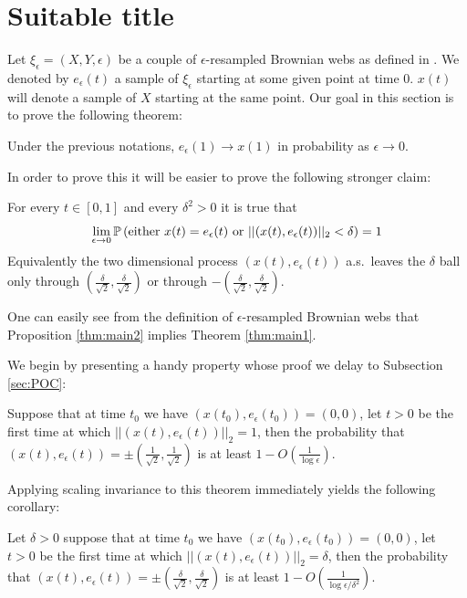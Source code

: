{
\newcommand{\eeps}{e_\epsilon}

\section{Suitable title}
Let $\xi_\epsilon=(X,Y,\epsilon)$ be a couple of $\epsilon$-resampled
Brownian webs as defined in . We denoted by $\eeps(t)$ a
sample of $\xi_\epsilon$ starting at some given point at time
$0$. $x(t)$ will denote a sample of $X$ starting at the same
point. Our goal in this section is to prove the following theorem:

\begin{theorem}\label{thm:main1}
Under the previous notations, $\eeps(1) \to x(1)$ in probability
as $\epsilon \to 0$.
\end{theorem}

\newcommand{\radiussq}{\delta^2}
\newcommand{\radius}{\delta}
\newcommand{\twonorm}[1]{||#1||_2}

\newcommand{\twodproc}[1]{(x(#1), \eeps(#1))}

In order to prove this it will be easier to prove the following
stronger claim:
\begin{propos}\label{thm:main2}
For every $t\in[0,1]$ and every $\radiussq>0$ it is true that
$$\ds \lim_{\epsilon \rightarrow 0}\P\left(\text{either } x(t)=\eeps(t)
\text{ or } \twonorm{\twodproc{t}} <\radius\right)=1$$
Equivalently the two dimensional process $\twodproc{t}$
a.s.\ leaves the $\radius$ ball only through $(\frac{\radius}{\sqrt2},\frac{\radius}{\sqrt2})$ or through $-(\frac{\radius}{\sqrt2},\frac{\radius}{\sqrt2})$.
\end{propos}

One can easily see from the definition of $\epsilon$-resampled
Brownian webs that Proposition \ref{thm:main2} implies Theorem
\ref{thm:main1}.

 We begin by presenting a handy property whose proof
we delay to Subsection \ref{sec:POC}:

\begin{propos}\label{thm:no-escape}
Suppose that at time $t_0$ we have
$\twodproc{t_0}=(0,0)$, let $t>0$ be the first time at which
$\twonorm{\twodproc{t}}=1$, then the probability
that $\twodproc{t} =\pm(\frac{1}{\sqrt2},\frac{1}{\sqrt2})$ is at least $1-O(\frac1{\log\epsilon})$.
\end{propos}

Applying scaling invariance to this theorem immediately yields the
following corollary:
\begin{cor}\label{cor:cor1}
Let $\radius>0$ suppose that at time $t_0$ we have $\twodproc{t_0}=(0,0)$, let
$t>0$ be the first time at which
$\twonorm{\twodproc{t}} = \radius$, then the probability
that $\twodproc{t} =\pm(\frac{\radius}{\sqrt2},\frac{\radius}{\sqrt2})$ is at least
$1-O(\frac{1}{\log\epsilon/\radiussq})$.
\end{cor}

}
